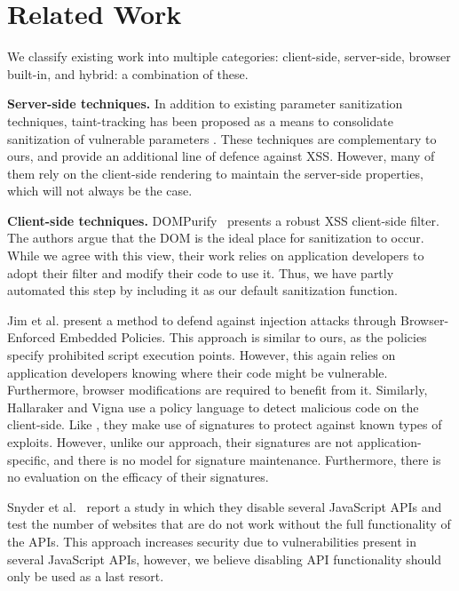 \section{Related Work}
We classify existing work into multiple categories: client-side, server-side, browser built-in, and hybrid: a combination of these.

\noindent \textbf{Server-side techniques.} 
In addition to existing parameter sanitization techniques,
taint-tracking has been proposed as a means to consolidate
sanitization of vulnerable parameters
\cite{Xu:2006:TPE:1267336.1267345,DBLP:conf/sec/Nguyen-TuongGGSE05,Pietraszek:2005:DAI:2146257.2146267,Bisht:2008:XPD:1428322.1428325}. These
techniques are complementary to ours, and provide an additional line
of defence against \ac{XSS}. However, many of them rely on the
client-side rendering to maintain the server-side properties, which
will not always be the case.

\noindent \textbf{Client-side techniques.} 
DOMPurify~\cite{10.1007/978-3-319-66399-9_7} presents a robust
\ac{XSS} client-side filter. The authors
argue that the DOM is the ideal place for sanitization to occur. While
we agree with this view, their work relies on application developers
to adopt their filter and modify their code to use it. Thus, we have partly automated this step by including it as our default sanitization function.

Jim et al. \cite{Jim:2007:DSI:1242572.1242654} present a method to
defend against injection attacks through Browser-Enforced Embedded
Policies. This approach is similar to ours, as the policies specify
prohibited script execution points. However, this again relies on application developers knowing where their code might be vulnerable. Furthermore, browser modifications are required to benefit from it. Similarly, Hallaraker and Vigna \cite{Hallaraker:2005:DMJ:1078029.1078861} use a
policy language to detect malicious code on the client-side. Like \sys, they make use of signatures to protect against known types of
exploits. However, unlike our approach, their signatures are not
application-specific, and there is no model for signature
maintenance. Furthermore, there is no evaluation on the efficacy of
their signatures.

Snyder et al.~\cite{Snyder:2017:MWD:3133956.3133966} report a study in which
they disable several JavaScript APIs and test the number of websites
that are do not work without the full functionality of the APIs. This approach increases security due to vulnerabilities present in several
JavaScript APIs, however, we believe disabling API functionality
should only be used as a last resort.

